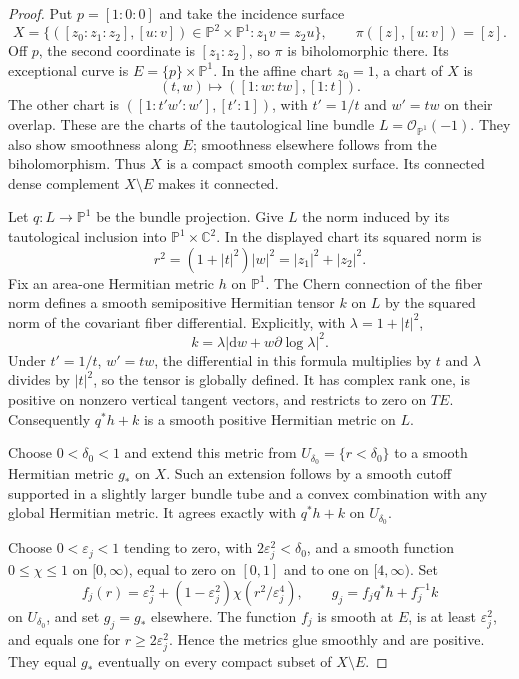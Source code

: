 \begin{proof}
Put $p=[1:0:0]$ and take the incidence surface
\[
 X=\bigl\{([z_0:z_1:z_2],[u:v])\in\mathbb P^2\times\mathbb P^1:
                     z_1v=z_2u\bigr\},
 \qquad \pi([z],[u:v])=[z].
\]
Off $p$, the second coordinate is $[z_1:z_2]$, so $\pi$ is biholomorphic there. Its exceptional curve is $E=\{p\}\times\mathbb P^1$. In the affine chart $z_0=1$, a chart of $X$ is
\[
 (t,w)\longmapsto([1:w:tw],[1:t]).
\]
The other chart is $([1:t'w':w'],[t':1])$, with $t'=1/t$ and $w'=tw$ on their overlap. These are the charts of the tautological line bundle $L=\mathcal O_{\mathbb P^1}(-1)$. They also show smoothness along $E$; smoothness elsewhere follows from the biholomorphism. Thus $X$ is a compact smooth complex surface. Its connected dense complement $X\setminus E$ makes it connected.

Let $q:L\to\mathbb P^1$ be the bundle projection. Give $L$ the norm induced by its tautological inclusion into $\mathbb P^1\times\mathbb C^2$. In the displayed chart its squared norm is
\[
 r^2=(1+|t|^2)|w|^2=|z_1|^2+|z_2|^2.
\]
Fix an area-one Hermitian metric $h$ on $\mathbb P^1$. The Chern connection of the fiber norm defines a smooth semipositive Hermitian tensor $k$ on $L$ by the squared norm of the covariant fiber differential. Explicitly, with $\lambda=1+|t|^2$,
\[
 k=\lambda\left|\mathrm{d}w+w\partial\log\lambda\right|^2.
\]
Under $t'=1/t$, $w'=tw$, the differential in this formula multiplies by $t$ and $\lambda$ divides by $|t|^2$, so the tensor is globally defined. It has complex rank one, is positive on nonzero vertical tangent vectors, and restricts to zero on $TE$. Consequently $q^*h+k$ is a smooth positive Hermitian metric on $L$.

Choose $0<\delta_0<1$ and extend this metric from $U_{\delta_0}=\{r<\delta_0\}$ to a smooth Hermitian metric $g_*$ on $X$. Such an extension follows by a smooth cutoff supported in a slightly larger bundle tube and a convex combination with any global Hermitian metric. It agrees exactly with $q^*h+k$ on $U_{\delta_0}$.

Choose $0<\varepsilon_j<1$ tending to zero, with $2\varepsilon_j^2<\delta_0$, and a smooth function $0\leq\chi\leq1$ on $[0,\infty)$, equal to zero on $[0,1]$ and to one on $[4,\infty)$. Set
\[
 f_j(r)=\varepsilon_j^2+(1-\varepsilon_j^2)
                     \chi(r^2/\varepsilon_j^4),
 \qquad
 g_j=f_jq^*h+f_j^{-1}k
\]
on $U_{\delta_0}$, and set $g_j=g_*$ elsewhere. The function $f_j$ is smooth at $E$, is at least $\varepsilon_j^2$, and equals one for $r\geq2\varepsilon_j^2$. Hence the metrics glue smoothly and are positive. They equal $g_*$ eventually on every compact subset of $X\setminus E$.


\end{proof}
